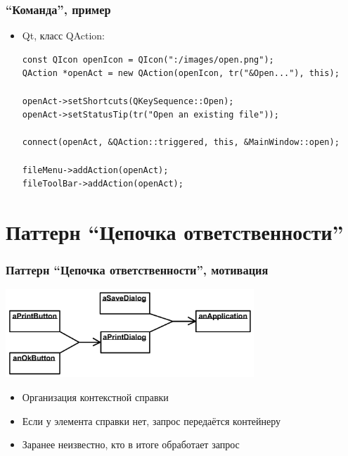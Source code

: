 \documentclass[xetex,mathserif,serif]{beamer}
\begin{document}
    \begin{frame}[fragile]
        \frametitle{``Команда'', пример}
        \begin{itemize}
            \item Qt, класс QAction:
            \begin{verbatim}
const QIcon openIcon = QIcon(":/images/open.png");
QAction *openAct = new QAction(openIcon, tr("&Open..."), this);

openAct->setShortcuts(QKeySequence::Open);
openAct->setStatusTip(tr("Open an existing file"));

connect(openAct, &QAction::triggered, this, &MainWindow::open);

fileMenu->addAction(openAct);
fileToolBar->addAction(openAct);
            \end{verbatim}
        \end{itemize}
\end{frame}

    \section{Паттерн ``Цепочка ответственности''}

    \begin{frame}
        \frametitle{Паттерн ``Цепочка ответственности'', мотивация}
        \begin{center}
            \includegraphics[width=0.7\textwidth]{chainOfResponsibilityExample.png}
        \end{center}
        \begin{itemize}
            \item Организация контекстной справки
            \item Если у элемента справки нет, запрос передаётся контейнеру
            \item Заранее неизвестно, кто в итоге обработает запрос
        \end{itemize}
    \end{frame}
\end{document}
